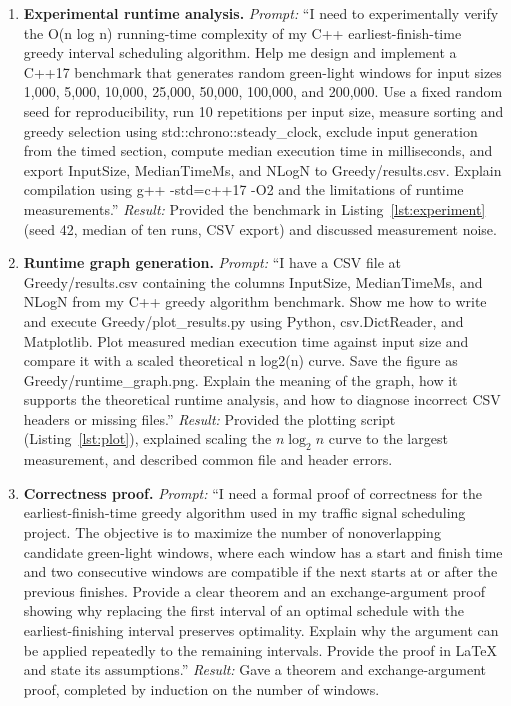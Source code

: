 \begin{enumerate}
\item \textbf{Experimental runtime analysis.}
\emph{Prompt:} ``I need to experimentally verify the
O(n log n) running-time complexity of my C++
earliest-finish-time greedy interval scheduling
algorithm. Help me design and implement a C++17
benchmark that generates random green-light windows for
input sizes 1,000, 5,000, 10,000, 25,000, 50,000,
100,000, and 200,000. Use a fixed random seed for
reproducibility, run 10 repetitions per input size,
measure sorting and greedy selection using
std::chrono::steady\_clock, exclude input generation
from the timed section, compute median execution time
in milliseconds, and export InputSize, MedianTimeMs, and
NLogN to Greedy/results.csv. Explain compilation using
g++ -std=c++17 -O2 and the limitations of runtime
measurements.''
\emph{Result:} Provided the benchmark in
Listing~\ref{lst:experiment} (seed 42, median of ten
runs, CSV export) and discussed measurement noise.

\item \textbf{Runtime graph generation.}
\emph{Prompt:} ``I have a CSV file at Greedy/results.csv
containing the columns InputSize, MedianTimeMs, and
NLogN from my C++ greedy algorithm benchmark. Show me
how to write and execute Greedy/plot\_results.py using
Python, csv.DictReader, and Matplotlib. Plot measured
median execution time against input size and compare it
with a scaled theoretical n log2(n) curve. Save the
figure as Greedy/runtime\_graph.png. Explain the meaning
of the graph, how it supports the theoretical runtime
analysis, and how to diagnose incorrect CSV headers or
missing files.''
\emph{Result:} Provided the plotting script
(Listing~\ref{lst:plot}), explained scaling the
$n\log_2 n$ curve to the largest measurement, and
described common file and header errors.

\item \textbf{Correctness proof.}
\emph{Prompt:} ``I need a formal proof of correctness for
the earliest-finish-time greedy algorithm used in my
traffic signal scheduling project. The objective is to
maximize the number of nonoverlapping candidate
green-light windows, where each window has a start and
finish time and two consecutive windows are compatible
if the next starts at or after the previous finishes.
Provide a clear theorem and an exchange-argument proof
showing why replacing the first interval of an optimal
schedule with the earliest-finishing interval preserves
optimality. Explain why the argument can be applied
repeatedly to the remaining intervals. Provide the
proof in LaTeX and state its assumptions.''
\emph{Result:} Gave a theorem and exchange-argument
proof, completed by induction on the number of windows.


\end{enumerate}
